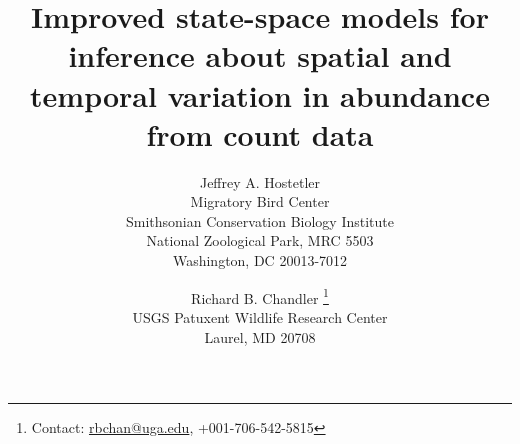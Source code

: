 \documentclass[12pt]{article}
\begin{document}
\title{Improved state-space models for inference about spatial
and temporal variation in abundance from count data}

\author{Jeffrey A. Hostetler\\ %
        \small Migratory Bird Center \\
        \small Smithsonian Conservation Biology Institute \\
        \small National Zoological Park, MRC 5503 \\
        \small Washington, DC 20013-7012\\
   \and Richard B. Chandler \footnote{Contact:
     \url{rbchan@uga.edu}, +001-706-542-5815} \\
        \small USGS Patuxent Wildlife Research Center \\
        \small Laurel, MD 20708}
\maketitle
\end{document}
